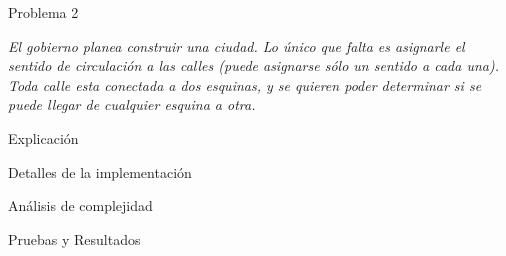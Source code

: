 \begin{section}{Problema 2}

	\textit{El gobierno planea construir una ciudad. Lo único que falta es asignarle el sentido de circulación a las calles (puede asignarse sólo un sentido a cada una). Toda calle esta conectada a dos esquinas, y se quieren poder determinar si se puede llegar de cualquier esquina a otra.}
		
	\begin{subsection}{Explicación}
		
	\end{subsection}

	\begin{subsection}{Detalles de la implementación}
		
	\end{subsection}


	\begin{subsection}{Análisis de complejidad}
		
	\end{subsection}


	\begin{subsection}{Pruebas y Resultados}

	\end{subsection}

\end{section}

